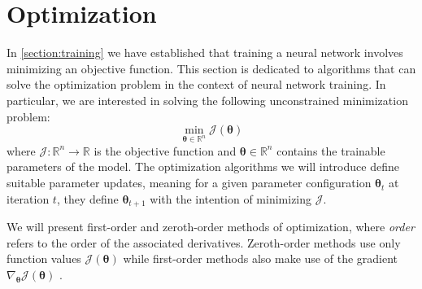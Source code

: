 \section{Optimization} \label{section:optimization}

In \autoref{section:training} we have established that training 
a neural network involves minimizing an objective function. This 
section is dedicated to algorithms that can solve the optimization
problem in the context of neural network training.   
In particular, we are interested in solving the following unconstrained minimization problem:
\begin{equation}
    \min_{\bm{\theta} \in \mathbb{R}^n} \mathcal{J}(\bm{\theta})
\end{equation}
where \(\mathcal{J}: \mathbb{R}^n \rightarrow \mathbb{R}\) 
is the objective function and \(\bm{\theta} \in \mathbb{R}^n\) 
contains the trainable parameters of the model.
The optimization algorithms we will introduce define 
suitable parameter updates, meaning for a 
given parameter configuration $\bm{\theta}_t$ 
at iteration $t$, they
define $\bm{\theta}_{t+1}$ with the intention of minimizing 
$\mathcal{J}$.

We will present first-order and zeroth-order methods 
of optimization, where \textit{order} refers to the 
order of the associated derivatives. Zeroth-order methods 
use only function values $\mathcal{J}(\bm{\theta})$ while 
first-order methods also make use of the gradient 
$\nabla_{\bm{\theta}} \mathcal{J}(\bm{\theta})$
\parencite{directsearch}. 

